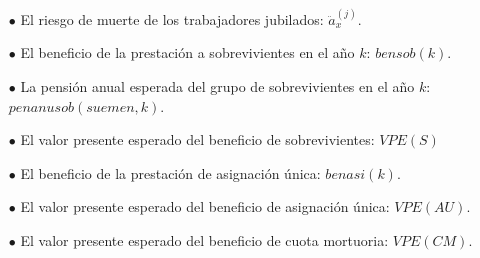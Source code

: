 \documentclass[12pt,letterpaper,titlepage]{article}
\begin{document}
\begin{itemize}
	\item [$\bullet$] El riesgo de muerte de los trabajadores jubilados: $\ddot{a}^{(j)}_{x}$.
	\item [$\bullet$] El beneficio de la prestación a sobrevivientes en el año $k$: $bensob(k)$.
	\item [$\bullet$] La pensión anual esperada del grupo de sobrevivientes en el año $k$: $penanusob(suemen,k)$.
	\item [$\bullet$] El valor presente esperado del beneficio de sobrevivientes: $VPE(S)$
	\item [$\bullet$] El beneficio de la prestación de asignación única: $benasi(k)$.
	\item [$\bullet$] El valor presente esperado del beneficio de asignación única: $VPE(AU)$.
	\item [$\bullet$] El valor presente esperado del beneficio de cuota mortuoria: $VPE(CM)$.
\end{itemize}




	
\end{document}
